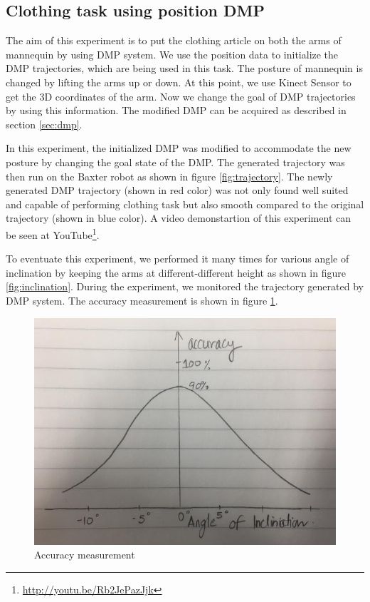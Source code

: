\documentclass[sigconf]{acmart}
\begin{document}
\subsection{Clothing task using position DMP}
The aim of this experiment is to put the clothing article on both the arms of mannequin by using DMP system. We use the position data to initialize the DMP trajectories, which are being used in this task. The posture of mannequin is changed by lifting the arms up or down. At this point, we use Kinect Sensor to get the 3D coordinates of the arm. Now we change the goal of DMP trajectories by using this information. The modified DMP can be acquired as described in section \ref{sec:dmp}.

In this experiment, the initialized DMP was modified to accommodate the new posture by changing the goal state of the DMP. The generated trajectory was then run on the Baxter robot as shown in figure \ref{fig:trajectory}. The newly generated DMP trajectory (shown in red color) was not only found well suited and capable of performing clothing task but also smooth compared to the original trajectory (shown in blue color). A video demonstartion of this experiment can be seen at YouTube\footnote{\url{http://youtu.be/Rb2JePazJjk}}.

To eventuate this experiment, we performed it many times for various angle of inclination by keeping the arms at different-different height as shown in figure \ref{fig:inclination}. During the experiment, we monitored the trajectory generated by DMP system. The accuracy measurement is shown in figure \ref{fig:accuracy}.

\begin{figure}
	\includegraphics[width=\linewidth]{accuracy}
	\caption{Accuracy measurement}
	\label{fig:accuracy}
\end{figure}
\end{document}
